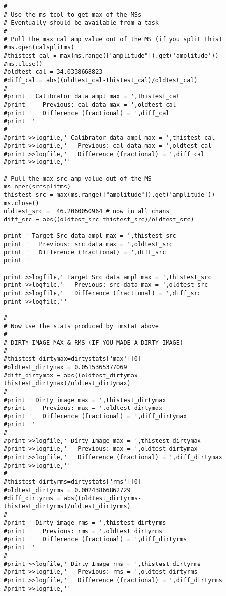 \begin{verbatim}
#
# Use the ms tool to get max of the MSs
# Eventually should be available from a task
#
# Pull the max cal amp value out of the MS (if you split this)
#ms.open(calsplitms)
#thistest_cal = max(ms.range(["amplitude"]).get('amplitude'))
#ms.close()
#oldtest_cal = 34.0338668823
#diff_cal = abs((oldtest_cal-thistest_cal)/oldtest_cal)
#
#print ' Calibrator data ampl max = ',thistest_cal
#print '   Previous: cal data max = ',oldtest_cal
#print '   Difference (fractional) = ',diff_cal
#print ''
#
#print >>logfile,' Calibrator data ampl max = ',thistest_cal
#print >>logfile,'   Previous: cal data max = ',oldtest_cal
#print >>logfile,'   Difference (fractional) = ',diff_cal
#print >>logfile,''

# Pull the max src amp value out of the MS
ms.open(srcsplitms)
thistest_src = max(ms.range(["amplitude"]).get('amplitude'))
ms.close()
oldtest_src =  46.2060050964 # now in all chans
diff_src = abs((oldtest_src-thistest_src)/oldtest_src)

print ' Target Src data ampl max = ',thistest_src
print '   Previous: src data max = ',oldtest_src
print '   Difference (fractional) = ',diff_src
print ''

print >>logfile,' Target Src data ampl max = ',thistest_src
print >>logfile,'   Previous: src data max = ',oldtest_src
print >>logfile,'   Difference (fractional) = ',diff_src
print >>logfile,''

#
# Now use the stats produced by imstat above
#
# DIRTY IMAGE MAX & RMS (IF YOU MADE A DIRTY IMAGE)
#
#thistest_dirtymax=dirtystats['max'][0]
#oldtest_dirtymax = 0.0515365377069
#diff_dirtymax = abs((oldtest_dirtymax-thistest_dirtymax)/oldtest_dirtymax)
#
#print ' Dirty image max = ',thistest_dirtymax
#print '   Previous: max = ',oldtest_dirtymax
#print '   Difference (fractional) = ',diff_dirtymax
#print ''
#
#print >>logfile,' Dirty Image max = ',thistest_dirtymax
#print >>logfile,'   Previous: max = ',oldtest_dirtymax
#print >>logfile,'   Difference (fractional) = ',diff_dirtymax
#print >>logfile,''
#
#thistest_dirtyrms=dirtystats['rms'][0]
#oldtest_dirtyrms = 0.00243866862729
#diff_dirtyrms = abs((oldtest_dirtyrms-thistest_dirtyrms)/oldtest_dirtyrms)
#
#print ' Dirty image rms = ',thistest_dirtyrms
#print '   Previous: rms = ',oldtest_dirtyrms
#print '   Difference (fractional) = ',diff_dirtyrms
#print ''
#
#print >>logfile,' Dirty Image rms = ',thistest_dirtyrms
#print >>logfile,'   Previous: rms = ',oldtest_dirtyrms
#print >>logfile,'   Difference (fractional) = ',diff_dirtyrms
#print >>logfile,''


\end{verbatim}
